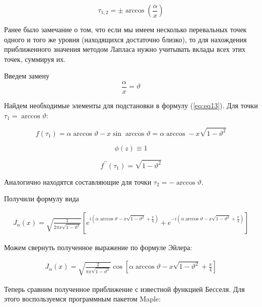 \documentclass[14pt]{extarticle}
\begin{document}
\begin{equation}\nonumber
\tau_{1,2} = \pm \arccos\left(\frac{\alpha}{x}\right)
\end{equation} 

Ранее было замечание о том, что если мы имеем несколько перевальных точек одного и того же уровня (находящихся достаточно близко), то для нахождения приближенного значения методом Лапласа нужно учитывать вклады всех этих точек, суммируя их.

Введем замену 
\begin{equation}\nonumber
\frac{\alpha}{x} = \vartheta
\end{equation}

Найдем необходимые элементы для подстановки в формулу (\ref{eq:eq13}). Для точки $\tau_1 = \arccos\vartheta$:

\begin{equation}\nonumber
f(\tau_1) = \alpha \arccos\vartheta - x \sin \arccos\vartheta = \alpha \arccos - x \sqrt{1-\vartheta^2}
\end{equation}

\begin{equation}\nonumber
\phi(z) \equiv 1
\end{equation}

\begin{equation}\nonumber
f^{\prime \prime} (\tau_1) = \sqrt{1-\vartheta^2}
\end{equation}

Аналогично находятся составляющие для точки $\tau_2 = -\arccos\vartheta$.

Получили формулу вида

\begin{eqnarray}\nonumber
J_\alpha(x) = \sqrt{\frac{1}{2 \pi x \sqrt{1-\vartheta^2}}} \left[ e^{i(\alpha \arccos 
	\vartheta - x \sqrt{1 - \vartheta^2} + \frac{\pi}{4})}  + e^{-i(\alpha \arccos 
	\vartheta - x \sqrt{1 - \vartheta^2} + \frac{\pi}{4})} \right]
\end{eqnarray}

Можем свернуть полученное выражение по формуле Эйлера:

\begin{eqnarray}\nonumber
J_\alpha(x) = \sqrt{\frac{2}{\pi x \sqrt{1-\vartheta^2}}} \cos \left[\alpha \arccos 
	\vartheta - x \sqrt{1 - \vartheta^2} + \frac{\pi}{4}\right]
\end{eqnarray}

Теперь сравним полученное приближение с известной функцией Бесселя. Для этого воспользуемся программным пакетом Maple:
\end{document}
